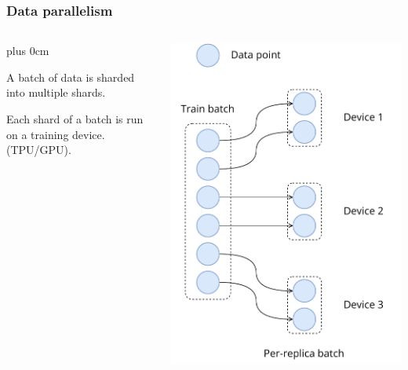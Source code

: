 \documentclass[11pt]{beamer}
\renewcommand{\raggedright}{\leftskip=0pt \rightskip=0pt plus 0cm}
\let\olditemize=\itemize
\renewenvironment{itemize}{\olditemize\raggedright}{\endlist}
\begin{document}
\begin{frame}
\frametitle{Data parallelism}
\begin{columns}[c]
\begin{column}{.6\textwidth}
\begin{itemize}
	\item A batch of data is sharded into multiple shards.
	\item Each shard of a batch is run on a training device. (TPU/GPU).
\end{itemize}
\end{column}
\begin{column}{.4\textwidth}
\begin{center}
\includegraphics[scale=.4]{images/model/data-parallel-Page-1.drawio.pdf}
\end{center}
\end{column}
\end{columns}
\end{frame}
\end{document}
